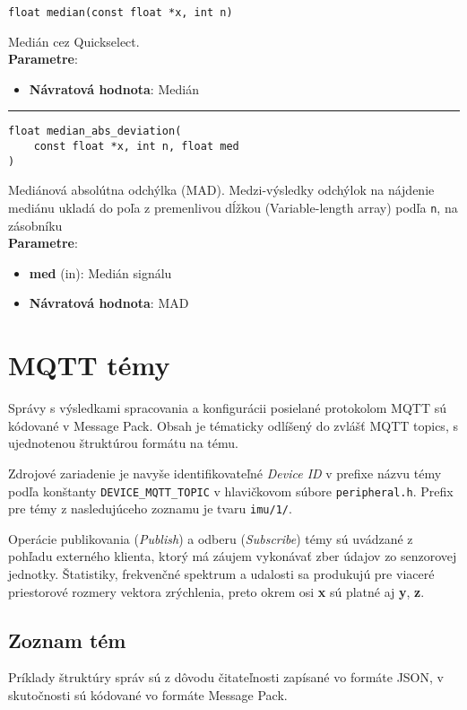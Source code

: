 \begin{lstlisting}[style=docs]
float median(const float *x, int n)
\end{lstlisting}
Medián cez Quickselect. \\ 
\textbf{Parametre}:
\begin{itemize}[noitemsep, topsep=0pt]
	\item \textbf{Návratová hodnota}: Medián
\end{itemize}
\bigbreak
\hrule

\begin{lstlisting}[style=docs]
float median_abs_deviation(
	const float *x, int n, float med
)
\end{lstlisting}
Mediánová absolútna odchýlka (MAD).  Medzi-výsledky odchýlok na nájdenie mediánu ukladá
do poľa z premenlivou dĺžkou (Variable-length array) podľa \verb|n|, na zásobníku \\
\textbf{Parametre}:
\begin{itemize}[noitemsep, topsep=0pt]
	\item \textbf{med} (in):  Medián signálu
	\item \textbf{Návratová hodnota}: MAD
\end{itemize}
\bigbreak

\section{MQTT témy}
Správy s výsledkami spracovania a konfigurácii posielané protokolom MQTT sú kódované v Message Pack.
Obsah je tématicky odlíšený do zvlášť MQTT topics, s ujednotenou štruktúrou formátu na tému.

Zdrojové zariadenie je navyše identifikovateľné \emph{Device ID} v prefixe názvu témy podľa konštanty
\verb|DEVICE_MQTT_TOPIC| v hlavičkovom súbore \verb|peripheral.h|. Prefix pre témy z nasledujúceho zoznamu je 
tvaru \verb|imu/1/|. 

Operácie publikovania (\emph{Publish}) a odberu (\emph{Subscribe}) témy sú uvádzané z pohľadu
externého klienta, ktorý má záujem vykonávať zber údajov zo senzorovej jednotky. Štatistiky, frekvenčné spektrum
a udalosti sa produkujú pre viaceré priestorové rozmery vektora zrýchlenia, preto okrem osi \textbf{x} sú platné 
aj \textbf{y}, \textbf{z}.
\bigbreak

\subsection*{Zoznam tém}
Príklady štruktúry správ sú z dôvodu čitateľnosti zapísané vo formáte JSON, v skutočnosti sú
kódované vo formáte Message Pack.


